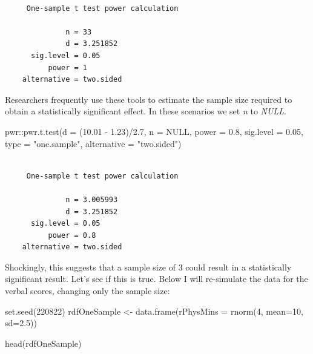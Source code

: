 \documentclass[
  11pt,
]{book}
\newenvironment{Shaded}{\begin{snugshade}}{\end{snugshade}}
\newcommand{\AttributeTok}[1]{\textcolor[rgb]{0.77,0.63,0.00}{#1}}
\newcommand{\ConstantTok}[1]{\textcolor[rgb]{0.00,0.00,0.00}{#1}}
\newcommand{\DecValTok}[1]{\textcolor[rgb]{0.00,0.00,0.81}{#1}}
\newcommand{\FloatTok}[1]{\textcolor[rgb]{0.00,0.00,0.81}{#1}}
\newcommand{\FunctionTok}[1]{\textcolor[rgb]{0.00,0.00,0.00}{#1}}
\newcommand{\NormalTok}[1]{#1}
\newcommand{\OtherTok}[1]{\textcolor[rgb]{0.56,0.35,0.01}{#1}}
\newcommand{\SpecialCharTok}[1]{\textcolor[rgb]{0.00,0.00,0.00}{#1}}
\newcommand{\StringTok}[1]{\textcolor[rgb]{0.31,0.60,0.02}{#1}}
\begin{document}
\begin{verbatim}

     One-sample t test power calculation 

              n = 33
              d = 3.251852
      sig.level = 0.05
          power = 1
    alternative = two.sided
\end{verbatim}

Researchers frequently use these tools to estimate the sample size required to obtain a statistically significant effect. In these scenarios we set \emph{n} to \emph{NULL}.

\begin{Shaded}
\begin{Highlighting}[]
\NormalTok{pwr}\SpecialCharTok{::}\FunctionTok{pwr.t.test}\NormalTok{(}\AttributeTok{d =}\NormalTok{ (}\FloatTok{10.01} \SpecialCharTok{{-}} \FloatTok{1.23}\NormalTok{)}\SpecialCharTok{/}\FloatTok{2.7}\NormalTok{, }\AttributeTok{n =} \ConstantTok{NULL}\NormalTok{, }\AttributeTok{power =} \FloatTok{0.8}\NormalTok{, }\AttributeTok{sig.level =} \FloatTok{0.05}\NormalTok{,}
    \AttributeTok{type =} \StringTok{"one.sample"}\NormalTok{, }\AttributeTok{alternative =} \StringTok{"two.sided"}\NormalTok{)}
\end{Highlighting}
\end{Shaded}

\begin{verbatim}

     One-sample t test power calculation 

              n = 3.005993
              d = 3.251852
      sig.level = 0.05
          power = 0.8
    alternative = two.sided
\end{verbatim}

Shockingly, this suggests that a sample size of 3 could result in a statistically significant result. Let's see if this is true. Below I will re-simulate the data for the verbal scores, changing only the sample size:

\begin{Shaded}
\begin{Highlighting}[]
\FunctionTok{set.seed}\NormalTok{(}\DecValTok{220822}\NormalTok{)}
\NormalTok{rdfOneSample }\OtherTok{\textless{}{-}} \FunctionTok{data.frame}\NormalTok{(}\AttributeTok{rPhysMins =} \FunctionTok{rnorm}\NormalTok{(}\DecValTok{4}\NormalTok{, }\AttributeTok{mean=}\DecValTok{10}\NormalTok{, }\AttributeTok{sd=}\FloatTok{2.5}\NormalTok{))}

\FunctionTok{head}\NormalTok{(rdfOneSample)}
\end{Highlighting}
\end{Shaded}
\end{document}
